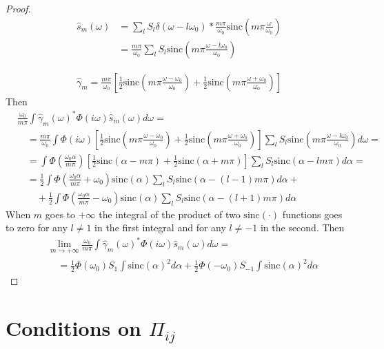 \documentclass[a4paper,10pt]{article}
\newcommand{\w}{\omega}
\newcommand{\sinc}{\mathrm{sinc}}
\begin{document}
\begin{proof}
	\begin{align}
		\hat s_m(\w) &= \sum_{l}S_l\delta(\w-l\w_0)*
			\frac{m\pi}{\w_0}\sinc\left(m\pi\frac{\w}{\w_0}\right)\\
		&= \frac{m\pi}{\w_0}
			\sum_{l}S_l \sinc\left(m\pi\frac{\w-l\w_0}{\w_0}\right)
	\end{align}

	\begin{align}
		\hat \gamma_m= \frac{m\pi}{\w_0}
			\left[
				\frac{1}{2}\sinc\left(m\pi\frac{\w-\w_0}{\w_0}\right)+
				\frac{1}{2}\sinc\left(m\pi\frac{\w+\w_0}{\w_0}\right)
			\right]
	\end{align}
	Then
	\begin{align*}
		&\frac{\w_0}{m\pi}\int \hat \gamma_m(\w)^* \Phi(i\w) \hat s_m(\w)d\w=\\
		&\quad = \frac{m\pi}{\w_0} \int \Phi(i\w)
			\left[
				\frac{1}{2}\sinc\left(m\pi\frac{\w-\w_0}{\w_0}\right)+
				\frac{1}{2}\sinc\left(m\pi\frac{\w+\w_0}{\w_0}\right)
			\right]
			\sum_{l}S_l \sinc\left(m\pi\frac{\w-l\w_0}{\w_0}\right)d\w=\\
		&\quad=\int \Phi\left(\frac{\w_0\alpha}{m\pi}\right)
			\left[
				\frac{1}{2}\sinc\left(\alpha-m\pi\right)+
				\frac{1}{2}\sinc\left(\alpha+m\pi\right)
			\right]
			\sum_{l}S_l \sinc\left(\alpha-lm\pi\right)d\alpha=\\
		&\quad= \frac{1}{2}\int\Phi\left(\frac{\w_0\alpha}{m\pi}+\w_0\right)
				\sinc(\alpha)
				\sum_{l}S_l \sinc\left(\alpha-(l-1)m\pi\right)d\alpha+\\
		&\qquad +\frac{1}{2}\int\Phi\left(\frac{\w_0\alpha}{m\pi}-\w_0\right)
				\sinc(\alpha)
				\sum_{l}S_l \sinc\left(\alpha-(l+1)m\pi\right)d\alpha
	\end{align*}
	When $m$ goes to $+\infty$ the integral of the product of two $\sinc(\cdot)$ functions goes to zero for any $l\neq 1$ in the first integral and for any $l\neq -1$ in the second.
	Then
	\begin{align*}
		&\lim_{m\rightarrow +\infty}
		\frac{\w_0}{m\pi}\int \hat \gamma_m(\w)^* \Phi(i\w) \hat s_m(\w)d\w=\\
		&\quad= \frac{1}{2}\Phi(\w_0)S_{1}\int\sinc(\alpha)^2d\alpha+
			\frac{1}{2}\Phi(-\w_0)S_{-1}\int\sinc(\alpha)^2 d\alpha
	\end{align*}
\end{proof}



\section{Conditions on $\Pi_{ij}$}
\end{document}
